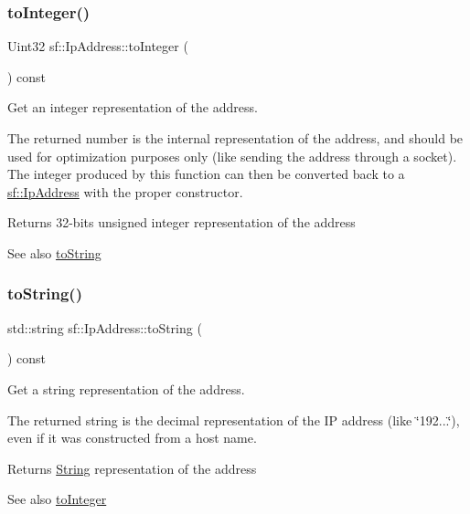 \subsubsection{\texorpdfstring{toInteger()}{toInteger()}}
{\footnotesize\ttfamily Uint32 sf\+::\+Ip\+Address\+::to\+Integer (\begin{DoxyParamCaption}{ }\end{DoxyParamCaption}) const}



Get an integer representation of the address. 

The returned number is the internal representation of the address, and should be used for optimization purposes only (like sending the address through a socket). The integer produced by this function can then be converted back to a \mbox{\hyperlink{classsf_1_1_ip_address}{sf\+::\+Ip\+Address}} with the proper constructor.

\begin{DoxyReturn}{Returns}
32-\/bits unsigned integer representation of the address
\end{DoxyReturn}
\begin{DoxySeeAlso}{See also}
\mbox{\hyperlink{classsf_1_1_ip_address_a88507954142d7fc2176cce7f36422340}{to\+String}} \begin{DoxyVerb}\end{DoxyVerb}
 
\end{DoxySeeAlso}
\mbox{\label{classsf_1_1_ip_address_a88507954142d7fc2176cce7f36422340}} 
\subsubsection{\texorpdfstring{toString()}{toString()}}
{\footnotesize\ttfamily std\+::string sf\+::\+Ip\+Address\+::to\+String (\begin{DoxyParamCaption}{ }\end{DoxyParamCaption}) const}



Get a string representation of the address. 

The returned string is the decimal representation of the IP address (like \char`\"{}192...\char`\"{}), even if it was constructed from a host name.

\begin{DoxyReturn}{Returns}
\mbox{\hyperlink{classsf_1_1_string}{String}} representation of the address
\end{DoxyReturn}
\begin{DoxySeeAlso}{See also}
\mbox{\hyperlink{classsf_1_1_ip_address_ae7911c5ea9562f9602c3e29cd54b15e9}{to\+Integer}} \begin{DoxyVerb}\end{DoxyVerb}
 
\end{DoxySeeAlso}


